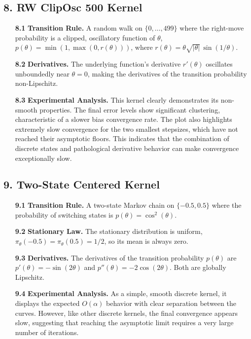 \documentclass[a4paper]{article}
\begin{document}
\subsection*{8. RW ClipOsc 500 Kernel}
\begin{itemize}
	\item[\bfseries 8.1] \textbf{Transition Rule.} A random walk on \(\{0,\dots,499\}\) where the right-move probability is a clipped, oscillatory function of \(\theta\), \( p(\theta) = \min(1, \max(0, r(\theta))) \), where \( r(\theta)=\theta\sqrt{|\theta|}\,\sin(1/\theta) \).
	\item[\bfseries 8.2] \textbf{Derivatives.} The underlying function's derivative \(r'(\theta)\) oscillates unboundedly near \(\theta=0\), making the derivatives of the transition probability non-Lipschitz.
	\item[\bfseries 8.3] \textbf{Experimental Analysis.} This kernel clearly demonstrates its non-smooth properties. The final error levels show significant clustering, characteristic of a slower bias convergence rate. The plot also highlights extremely slow convergence for the two smallest stepsizes, which have not reached their asymptotic floors. This indicates that the combination of discrete states and pathological derivative behavior can make convergence exceptionally slow.
\end{itemize}

\subsection*{9. Two-State Centered Kernel}
\begin{itemize}
	\item[\bfseries 9.1] \textbf{Transition Rule.} A two-state Markov chain on \(\{-0.5, 0.5\}\) where the probability of switching states is \(p(\theta) = \cos^2(\theta)\).
	\item[\bfseries 9.2] \textbf{Stationary Law.} The stationary distribution is uniform, \(\pi_\theta(-0.5) = \pi_\theta(0.5) = 1/2\), so its mean is always zero.
	\item[\bfseries 9.3] \textbf{Derivatives.} The derivatives of the transition probability \(p(\theta)\) are \( p'(\theta) = -\sin(2\theta) \) and \( p''(\theta) = -2\cos(2\theta) \). Both are globally Lipschitz.
	\item[\bfseries 9.4] \textbf{Experimental Analysis.} As a simple, smooth discrete kernel, it displays the expected \(O(\alpha)\) behavior with clear separation between the curves. However, like other discrete kernels, the final convergence appears slow, suggesting that reaching the asymptotic limit requires a very large number of iterations.
\end{itemize}
\end{document}
